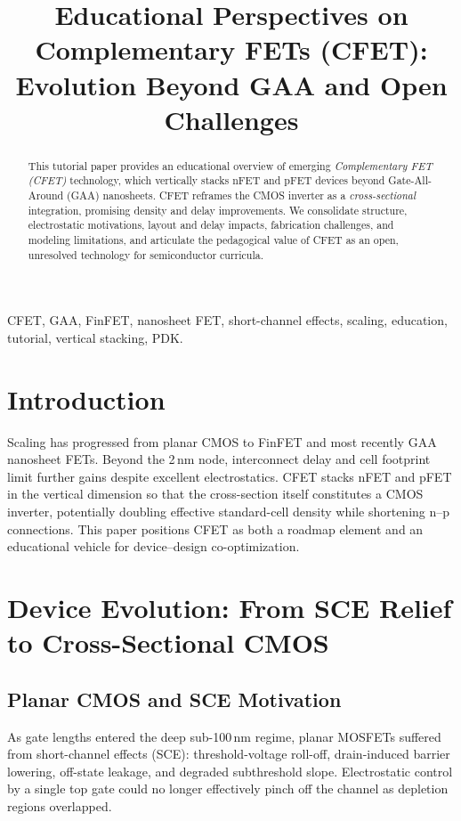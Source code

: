 \documentclass[conference]{IEEEtran}
\title{Educational Perspectives on Complementary FETs (CFET):\\
Evolution Beyond GAA and Open Challenges}
\author{
\IEEEauthorblockN{Shinichi Samizo}
\IEEEauthorblockA{Independent Semiconductor Researcher\\
Project Design Hub, Samizo-AITL\\
\textit{Email:} \href{mailto:shin3t72@gmail.com}{shin3t72@gmail.com}\quad
\textit{GitHub:} \href{https://github.com/Samizo-AITL}{Samizo-AITL}}
}
\begin{document}
\maketitle

\begin{abstract}
This tutorial paper provides an educational overview of emerging
\emph{Complementary FET (CFET)} technology, which vertically stacks nFET and pFET devices beyond Gate-All-Around (GAA) nanosheets.
CFET reframes the CMOS inverter as a \emph{cross-sectional} integration, promising density and delay improvements.
We consolidate structure, electrostatic motivations, layout and delay impacts, fabrication challenges, and modeling limitations, and articulate the pedagogical value of CFET as an open, unresolved technology for semiconductor curricula.
\end{abstract}

\begin{IEEEkeywords}
CFET, GAA, FinFET, nanosheet FET, short-channel effects, scaling, education, tutorial, vertical stacking, PDK.
\end{IEEEkeywords}

\section{Introduction}
Scaling has progressed from planar CMOS to FinFET and most recently GAA nanosheet FETs.
Beyond the 2\,nm node, interconnect delay and cell footprint limit further gains despite excellent electrostatics.
CFET stacks nFET and pFET in the vertical dimension so that the cross-section itself constitutes a CMOS inverter, potentially doubling effective standard-cell density while shortening n--p connections.
This paper positions CFET as both a roadmap element and an educational vehicle for device--design co-optimization.

\section{Device Evolution: From SCE Relief to Cross-Sectional CMOS}
\label{sec:evo}
\subsection{Planar CMOS and SCE Motivation}
As gate lengths entered the deep sub-100\,nm regime, planar MOSFETs suffered
from short-channel effects (SCE): threshold-voltage roll-off, drain-induced barrier lowering, off-state leakage, and degraded subthreshold slope.
Electrostatic control by a single top gate could no longer effectively pinch off the channel as depletion regions overlapped.
\end{document}
